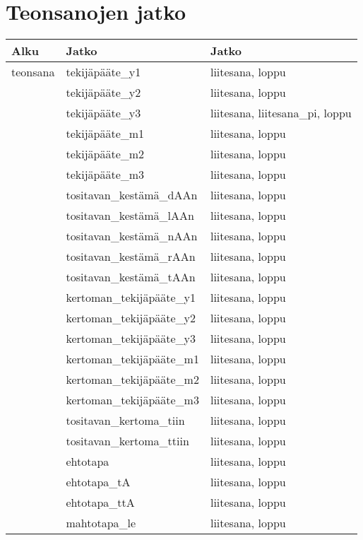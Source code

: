 \section{Teonsanojen jatko}

\begin{tabular}{|l|l|l|}
\hline
Alku     & Jatko                     & Jatko \\
\hline
teonsana & tekijäpääte\_y1           & liitesana, loppu \\
         & tekijäpääte\_y2           & liitesana, loppu \\
         & tekijäpääte\_y3           & liitesana, liitesana\_pi, loppu \\
         & tekijäpääte\_m1           & liitesana, loppu \\
         & tekijäpääte\_m2           & liitesana, loppu \\
         & tekijäpääte\_m3           & liitesana, loppu \\
         & tositavan\_kestämä\_dAAn  & liitesana, loppu \\
         & tositavan\_kestämä\_lAAn  & liitesana, loppu \\
         & tositavan\_kestämä\_nAAn  & liitesana, loppu \\
         & tositavan\_kestämä\_rAAn  & liitesana, loppu \\
         & tositavan\_kestämä\_tAAn  & liitesana, loppu \\ \hline
         & kertoman\_tekijäpääte\_y1 & liitesana, loppu \\
         & kertoman\_tekijäpääte\_y2 & liitesana, loppu \\
         & kertoman\_tekijäpääte\_y3 & liitesana, loppu \\
         & kertoman\_tekijäpääte\_m1 & liitesana, loppu \\
         & kertoman\_tekijäpääte\_m2 & liitesana, loppu \\
         & kertoman\_tekijäpääte\_m3 & liitesana, loppu \\
         & tositavan\_kertoma\_tiin  & liitesana, loppu \\
         & tositavan\_kertoma\_ttiin & liitesana, loppu \\ \hline
         & ehtotapa       & liitesana, loppu \\
         & ehtotapa\_tA   & liitesana, loppu \\
         & ehtotapa\_ttA  & liitesana, loppu \\ \hline
         & mahtotapa\_le  & liitesana, loppu \\

\end{tabular}
